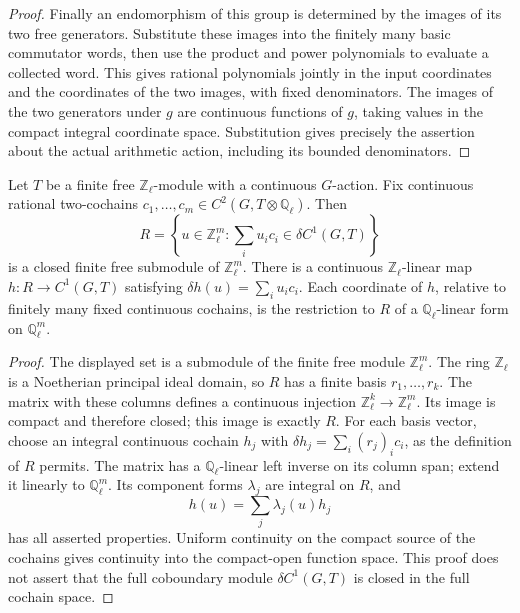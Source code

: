 \begin{proof}
Finally an endomorphism of this group is determined by the
images of its two free generators. Substitute these images into
the finitely many basic commutator words, then use the product
and power polynomials to evaluate a collected word. This gives
rational polynomials jointly in the input coordinates and the
coordinates of the two images, with fixed denominators. The
images of the two generators under \(g\) are continuous functions
of \(g\), taking values in the compact integral coordinate space.
Substitution gives precisely the assertion about the actual
arithmetic action, including its bounded denominators.
\end{proof}

\begin{lemma}
\label{lem:ghost-primitive-family}
Let \(T\) be a finite free \(\mathbb Z_\ell\)-module with a
continuous \(G\)-action. Fix continuous rational two-cochains
\(c_1,\ldots,c_m\in C^2(G,T\otimes\mathbb Q_\ell)\). Then
\[
 R=\left\{u\in\mathbb Z_\ell^m:
       \sum_i u_i c_i\in\delta C^1(G,T)\right\}
\]
is a closed finite free submodule of \(\mathbb Z_\ell^m\).
There is a continuous \(\mathbb Z_\ell\)-linear map
\(h:R\to C^1(G,T)\) satisfying
\(\delta h(u)=\sum_i u_i c_i\). Each coordinate of \(h\),
relative to finitely many fixed continuous cochains, is the
restriction to \(R\) of a \(\mathbb Q_\ell\)-linear form on
\(\mathbb Q_\ell^m\).
\end{lemma}
\begin{proof}
The displayed set is a submodule of the finite free module
\(\mathbb Z_\ell^m\). The ring \(\mathbb Z_\ell\) is a
Noetherian principal ideal domain, so \(R\) has a finite basis
\(r_1,\ldots,r_k\). The matrix with these columns defines a
continuous injection \(\mathbb Z_\ell^k\to\mathbb Z_\ell^m\).
Its image is compact and therefore closed; this image is exactly
\(R\). For each basis vector, choose an integral continuous
cochain \(h_j\) with
\(\delta h_j=\sum_i(r_j)_i c_i\), as the definition of \(R\)
permits. The matrix has a \(\mathbb Q_\ell\)-linear left inverse
on its column span; extend it linearly to \(\mathbb Q_\ell^m\).
Its component forms \(\lambda_j\) are integral on \(R\), and
\[
                    h(u)=\sum_j\lambda_j(u)h_j
\]
has all asserted properties. Uniform continuity on the compact
source of the cochains gives continuity into the compact-open
function space. This proof does not assert that the full coboundary
module \(\delta C^1(G,T)\) is closed in the full cochain space.
\end{proof}

